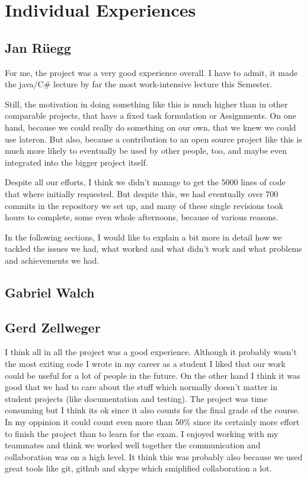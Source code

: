 \section{Individual Experiences}
\label{individual}

\subsection{Jan Rüegg}
\label{individual:jan}
For me, the project was a very good experience overall. I have to admit, it made the java/C\# lecture by far the most work-intensive lecture this Semester.

Still, the motivation in doing something like this is much higher than in other comparable projects, that have a fixed task formulation or Assignments. On one hand, because we could really do something on our own, that we knew we could use lateron. But also, because a contribution to an open source project like this is much more likely to eventually be used by other people, too, and maybe even integrated into the bigger project itself.

Despite all our efforts, I think we didn't manage to get the 5000 lines of code that where initially requested. But despite this, we had eventually over 700 commits in the repository we set up, and many of these single revisions took hours to complete, some even whole afternoons, because of various reasons.

In the following sections, I would like to explain a bit more in detail how we tackled the issues we had, what worked and what didn't work and what problems and achievements we had.

\subsection{Gabriel Walch}
\label{individual:gabriel}


\subsection{Gerd Zellweger}
\label{individual:gerd}
I think all in all the project was a good experience. Although it probably wasn't the most exiting code I wrote in my career as a student I liked that our work could be useful for a lot of people in the future. On the other hand I think it was good that we had to care about the stuff which normally doesn't matter in student projects (like documentation and testing). The project was time consuming but I think its ok since it also counts for the final grade of the course. In my oppinion it could count even more than 50\% since its certainly more effort to finish the project than to learn for the exam.
I enjoyed working with my teammates and think we worked well together the communication and collaboration was on a high level. It think this was probably also because we used great tools like git, github and skype which smiplified collaboration a lot.


